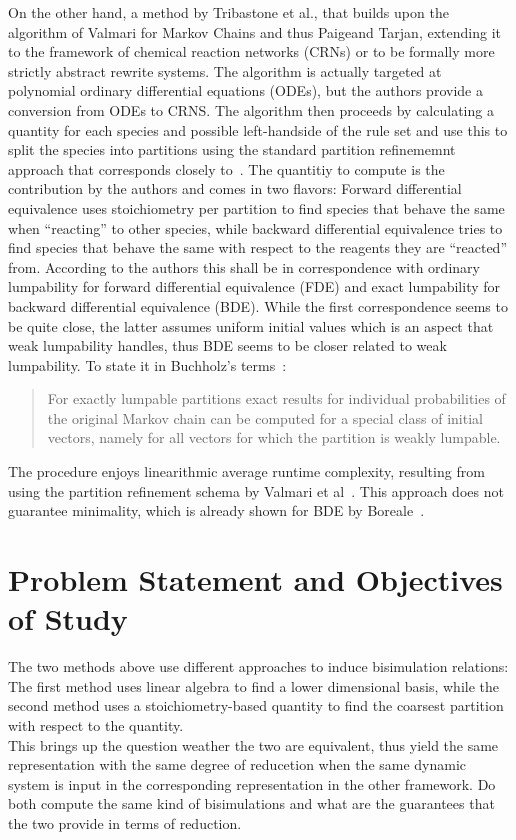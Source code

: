 \documentclass[11pt, rgb]{scrartcl}
\begin{document}
On the other hand, a method by Tribastone et al.\autocite{Cardelli2017MaximalAO}, that builds upon the algorithm of Valmari for Markov Chains\autocite{valmari} and thus Paigeand Tarjan\autocite{paigetarjan}, extending it to the framework of chemical reaction networks (CRNs) or to be formally more strictly abstract rewrite systems. The algorithm is actually targeted at polynomial ordinary differential equations (ODEs), but the authors provide a conversion from ODEs to CRNS. The algorithm then proceeds by calculating a quantity for each species and possible left-handside of the rule set and use this to split the species into partitions using the standard partition refinememnt approach that corresponds closely to~\autocite{valmari}. The quantitiy to compute is the contribution by the authors and comes in two flavors: Forward differential equivalence uses stoichiometry per partition to find species that behave the same when ``reacting'' to other species, while backward differential equivalence tries to find species that behave the same with respect to the reagents they are ``reacted'' from. According to the authors this shall be in correspondence with ordinary lumpability for forward differential equivalence (FDE) and exact lumpability for backward differential equivalence (BDE). While the first correspondence seems to be quite close, the latter assumes uniform initial values which is an aspect that weak lumpability handles, thus BDE seems to be closer related to weak lumpability. To state it in Buchholz's terms~\autocite{buchholz}:
\begin{quote}
 For exactly lumpable partitions exact results for individual probabilities of the original Markov chain can be computed for a special class of initial vectors, namely for all vectors for which the partition is weakly lumpable.
\end{quote}
The procedure enjoys linearithmic average runtime complexity, resulting from using the partition refinement schema by Valmari et al~\autocite{valmari}. This approach does not guarantee minimality, which is already shown for BDE by Boreale~\autocite{boreale2017algebra}. \\
 

\section{Problem Statement and Objectives of Study}
The two methods above use different approaches to induce bisimulation relations: The first method uses linear algebra to find a lower dimensional basis, while the second method uses a stoichiometry-based quantity to find the coarsest partition with respect to the quantity. \\
This brings up the question weather the two are equivalent, thus yield the same representation with the same degree of reducetion when the same dynamic system is input in the corresponding representation in the other framework. Do both compute the same kind of bisimulations and what are the guarantees that the two provide in terms of reduction. \\
\end{document}
